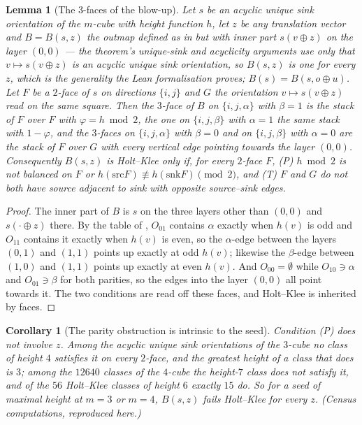 \documentclass[11pt]{article}
\theoremstyle{plain}
\newtheorem{lemma}[theorem]{Lemma}
\newtheorem{corollary}[theorem]{Corollary}
\theoremstyle{definition}
\begin{document}
\begin{lemma}[The $3$-faces of the blow-up]\label{lem:blowup-faces}
Let $s$ be an acyclic unique sink orientation of the $m$-cube with height
function $h$, let $z$ be any translation vector and $B=B(s,z)$ the outmap
defined as in  but with inner part $s(v\oplus z)$ on the
layer $(0,0)$ --- the theorem's unique-sink and acyclicity arguments use
only that $v\mapsto s(v\oplus z)$ is an acyclic unique sink orientation,
so $B(s,z)$ is one for every $z$, which is the generality the Lean
formalisation proves; $B(s)=B(s,o\oplus u)$. Let
$F$ be a $2$-face of $s$ on directions $\{i,j\}$ and $G$ the orientation
$v\mapsto s(v\oplus z)$ read on the same square. Then the $3$-face of $B$
on $\{i,j,\alpha\}$ with $\beta=1$ is the stack of $F$ over $F$ with
$\varphi=h\bmod2$, the one on $\{i,j,\beta\}$ with $\alpha=1$ the same
stack with $1-\varphi$, and the $3$-faces on $\{i,j,\alpha\}$ with
$\beta=0$ and on $\{i,j,\beta\}$ with $\alpha=0$ are the stack of $F$ over
$G$ with every vertical edge pointing towards the layer $(0,0)$.
Consequently $B(s,z)$ is Holt--Klee only if, for every $2$-face $F$,
\emph{(P)} $h\bmod2$ is not balanced on $F$ or
$h(\mathrm{src}F)\not\equiv h(\mathrm{snk}F)\pmod2$, and
\emph{(T)} $F$ and $G$ do not both have source adjacent to sink with
opposite source--sink edges.
\end{lemma}

\begin{proof}
The inner part of $B$ is $s$ on the three layers other than $(0,0)$ and
$s(\cdot\oplus z)$ there. By the table of , $O_{01}$
contains $\alpha$ exactly when $h(v)$ is odd and $O_{11}$ contains it
exactly when $h(v)$ is even, so the $\alpha$-edge between the layers
$(0,1)$ and $(1,1)$ points up exactly at odd $h(v)$; likewise the
$\beta$-edge between $(1,0)$ and $(1,1)$ points up exactly at even
$h(v)$. And $O_{00}=\emptyset$ while $O_{10}\ni\alpha$ and $O_{01}\ni\beta$
for both parities, so the edges into the layer $(0,0)$ all point towards
it. The two conditions are  read off these faces, and
Holt--Klee is inherited by faces.
\end{proof}

\begin{corollary}[The parity obstruction is intrinsic to the seed]\label{cor:blowup-parity}
Condition \emph{(P)} does not involve $z$. Among the acyclic unique sink
orientations of the $3$-cube no class of height $4$ satisfies it on every
$2$-face, and the greatest height of a class that does is $3$; among the
$12640$ classes of the $4$-cube the height-$7$ class does not satisfy it,
and of the $56$ Holt--Klee classes of height $6$ exactly $15$ do. So for a
seed of maximal height at $m=3$ or $m=4$, $B(s,z)$ fails Holt--Klee for
every $z$. (Census computations, reproduced here.)
\end{corollary}
\end{document}
